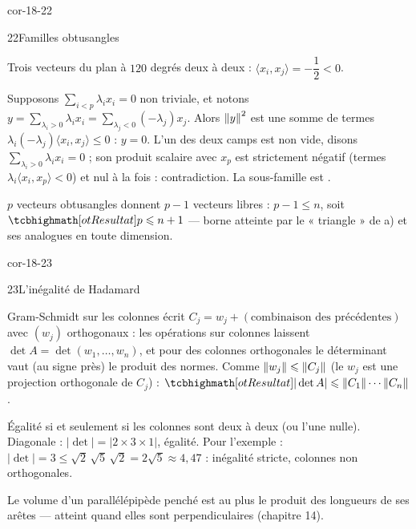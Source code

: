 \begin{blocLivre}{cor-18-22}
\begin{corrige}{22}{Familles obtusangles}
\begin{questions}
  \item Trois vecteurs du plan à $120$ degrés deux à deux :
    $\langle x_i,x_j\rangle=-\dfrac12<0$.
  \item Supposons $\sum_{i<p}\lambda_ix_i=0$ non triviale, et notons
    $y=\sum_{\lambda_i>0}\lambda_ix_i=\sum_{\lambda_j<0}(-\lambda_j)x_j$.
    Alors $\left\lVert y\right\rVert^{2}$ est une somme de termes
    $\lambda_i(-\lambda_j)\langle x_i,x_j\rangle\leqslant0$ : $y=0$.
    L'un des deux camps est non vide, disons
    $\sum_{\lambda_i>0}\lambda_ix_i=0$ ; son produit scalaire avec
    $x_p$ est strictement négatif (termes $\lambda_i\langle
    x_i,x_p\rangle<0$) et nul à la fois : contradiction. La sous-famille
    est .
  \item $p$ vecteurs obtusangles donnent $p-1$ vecteurs libres :
    $p-1\leqslant n$, soit $\res{p\leqslant n+1}$ — borne atteinte par le
    « triangle » de a) et ses analogues en toute dimension.
\end{questions}
\end{corrige}
\end{blocLivre}

\begin{blocLivre}{cor-18-23}
\begin{corrige}{23}{L'inégalité de Hadamard}
\begin{questions}
  \item Gram-Schmidt sur les colonnes écrit $C_j=w_j+(\text{combinaison
    des précédentes})$ avec $(w_j)$ orthogonaux : les opérations sur
    colonnes laissent $\det A=\det(w_1,\dots,w_n)$, et pour des colonnes
    orthogonales le déterminant vaut (au signe près) le produit des
    normes. Comme $\left\lVert w_j\right\rVert\leqslant\left\lVert C_j\right\rVert$ (le $w_j$ est une
    projection orthogonale de $C_j$) :
    $\res{|\det A|\leqslant\norme{C_1}\cdots\norme{C_n}}$.
  \item Égalité si et seulement si les colonnes sont deux à deux
     (ou l'une nulle). Diagonale :
    $|{\det}|=|2\times3\times1|$, égalité. Pour l'exemple :
    $|\det|=3\leqslant\sqrt2\,\sqrt5\,\sqrt2=2\sqrt5\approx4{,}47$ :
    inégalité stricte, colonnes non orthogonales.
  \item Le volume d'un parallélépipède penché est au plus le produit des
    longueurs de ses arêtes — atteint quand elles sont perpendiculaires
    (chapitre 14).
\end{questions}
\end{corrige}
\end{blocLivre}

